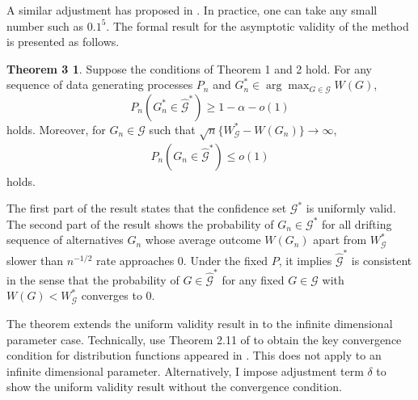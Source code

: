 \documentclass[12pt,oneside,reqno,english]{amsart}
\theoremstyle{definition}
\newtheorem*{thm3}{Theorem 3}
\begin{document}
A similar adjustment has proposed in \cite{AS:13}.
In practice, one can take any small number such as $0.1^{5}$. 
The formal result for the asymptotic validity of the method is presented as follows. 
\begin{thm3} 
Suppose the conditions of Theorem 1 and 2 hold. 
For any sequence of data generating processes $P_{n}$ and $G^{*}_{n}\in \arg\max_{G\in \mathcal{G}}W(G)$,
\[P_{n}(G^{*}_{n}\in \hat{\mathcal{G}}^{*})\geq 1-\alpha-o(1)\]
holds. Moreover, for $G_{n}\in \mathcal{G}$ such that $\sqrt{n}\{W^{*}_{\mathcal{G}}-W(G_{n})\}\rightarrow \infty$,  
\begin{align*}
P_{n}(G_{n}\in \hat{\mathcal{G}}^{*})\leq o(1)
\end{align*}
holds.
\end{thm3}
The first part of the result states that the confidence set $\mathcal{G}^{*}$ is uniformly valid. 
The second part of the result shows the probability of $G_{n}\in \mathcal{G}^{*}$ for all drifting sequence of alternatives 
$G_{n}$ whose average outcome $W(G_{n})$ apart from $W_{\mathcal{G}}^{*}$ slower than $n^{-1/2}$ rate approaches $0$.
Under the fixed $P$, it implies $\hat{\mathcal{G}}^{*}$ is consistent in the sense that 
the probability of $G\in \hat{\mathcal{G}}^{*}$ for any fixed $G\in \mathcal{G}$ with $W(G)<W^{*}_{\mathcal{G}}$ converges to $0$. 

The theorem extends the uniform validity result in \cite{HL:18} to the infinite dimensional parameter case.
Technically, \cite{HL:18} use Theorem 2.11 of \cite{BR:76}
to obtain the key convergence condition for distribution functions appeared in \cite{RS:12}. 
This does not apply to an infinite dimensional parameter. Alternatively, I impose adjustment term $\delta$ to show the uniform validity result without the convergence condition.  
\end{document}
